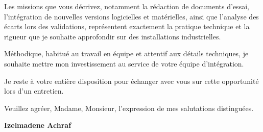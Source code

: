 \documentclass[10pt,a4paper]{altacv}
\begin{document}
\vspace{0.35cm}

Les missions que vous décrivez, notamment la rédaction de documents d'essai, l'intégration de nouvelles versions logicielles et matérielles, ainsi que l'analyse des écarts lors des validations, représentent exactement la pratique technique et la rigueur que je souhaite approfondir sur des installations industrielles.

\vspace{0.35cm}

Méthodique, habitué au travail en équipe et attentif aux détails techniques, je souhaite mettre mon investissement au service de votre équipe d'intégration.

\vspace{0.35cm}

Je reste à votre entière disposition pour échanger avec vous sur cette opportunité lors d'un entretien.

\vspace{0.4cm}

Veuillez agréer, Madame, Monsieur, l'expression de mes salutations distinguées.

\vfill

\begin{flushright}
  \Large\color{emphasis}\textbf{Izelmadene Achraf}
\end{flushright}
\end{document}
